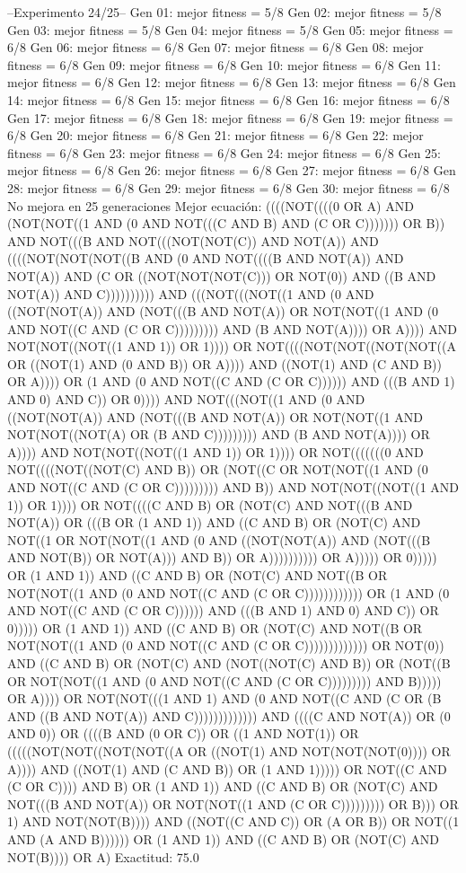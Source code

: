 --Experimento 
 24/25--
Gen 01: mejor fitness = 5/8
Gen 02: mejor fitness = 5/8
Gen 03: mejor fitness = 5/8
Gen 04: mejor fitness = 5/8
Gen 05: mejor fitness = 6/8
Gen 06: mejor fitness = 6/8
Gen 07: mejor fitness = 6/8
Gen 08: mejor fitness = 6/8
Gen 09: mejor fitness = 6/8
Gen 10: mejor fitness = 6/8
Gen 11: mejor fitness = 6/8
Gen 12: mejor fitness = 6/8
Gen 13: mejor fitness = 6/8
Gen 14: mejor fitness = 6/8
Gen 15: mejor fitness = 6/8
Gen 16: mejor fitness = 6/8
Gen 17: mejor fitness = 6/8
Gen 18: mejor fitness = 6/8
Gen 19: mejor fitness = 6/8
Gen 20: mejor fitness = 6/8
Gen 21: mejor fitness = 6/8
Gen 22: mejor fitness = 6/8
Gen 23: mejor fitness = 6/8
Gen 24: mejor fitness = 6/8
Gen 25: mejor fitness = 6/8
Gen 26: mejor fitness = 6/8
Gen 27: mejor fitness = 6/8
Gen 28: mejor fitness = 6/8
Gen 29: mejor fitness = 6/8
Gen 30: mejor fitness = 6/8
No mejora en 25 generaciones
Mejor ecuación: ((((NOT((((0 OR A) AND (NOT(NOT((1 AND (0 AND NOT(((C AND B) AND (C OR C))))))) OR B)) AND NOT(((B AND NOT(((NOT(NOT(C)) AND NOT(A)) AND ((((NOT(NOT(NOT((B AND (0 AND NOT((((B AND NOT(A)) AND NOT(A)) AND (C OR ((NOT(NOT(NOT(C))) OR NOT(0)) AND ((B AND NOT(A)) AND C)))))))))) AND (((NOT(((NOT((1 AND (0 AND ((NOT(NOT(A)) AND (NOT(((B AND NOT(A)) OR NOT(NOT((1 AND (0 AND NOT((C AND (C OR C))))))))) AND (B AND NOT(A)))) OR A)))) AND NOT(NOT((NOT((1 AND 1)) OR 1)))) OR NOT((((NOT(NOT((NOT(NOT((A OR ((NOT(1) AND (0 AND B)) OR A)))) AND ((NOT(1) AND (C AND B)) OR A)))) OR (1 AND (0 AND NOT((C AND (C OR C)))))) AND (((B AND 1) AND 0) AND C)) OR 0)))) AND NOT(((NOT((1 AND (0 AND ((NOT(NOT(A)) AND (NOT(((B AND NOT(A)) OR NOT(NOT((1 AND NOT(NOT((NOT(A) OR (B AND C))))))))) AND (B AND NOT(A)))) OR A)))) AND NOT(NOT((NOT((1 AND 1)) OR 1)))) OR NOT(((((((0 AND NOT((((NOT((NOT(C) AND B)) OR (NOT((C OR NOT(NOT((1 AND (0 AND NOT((C AND (C OR C))))))))) AND B)) AND NOT(NOT((NOT((1 AND 1)) OR 1)))) OR NOT((((C AND B) OR (NOT(C) AND NOT(((B AND NOT(A)) OR (((B OR (1 AND 1)) AND ((C AND B) OR (NOT(C) AND NOT((1 OR NOT(NOT((1 AND (0 AND ((NOT(NOT(A)) AND (NOT(((B AND NOT(B)) OR NOT(A))) AND B)) OR A)))))))))) OR A))))) OR 0))))) OR (1 AND 1)) AND ((C AND B) OR (NOT(C) AND NOT((B OR NOT(NOT((1 AND (0 AND NOT((C AND (C OR C)))))))))))) OR (1 AND (0 AND NOT((C AND (C OR C)))))) AND (((B AND 1) AND 0) AND C)) OR 0))))) OR (1 AND 1)) AND ((C AND B) OR (NOT(C) AND NOT((B OR NOT(NOT((1 AND (0 AND NOT((C AND (C OR C))))))))))))) OR NOT(0)) AND ((C AND B) OR (NOT(C) AND (NOT((NOT(C) AND B)) OR (NOT((B OR NOT(NOT((1 AND (0 AND NOT((C AND (C OR C))))))))) AND B))))) OR A)))) OR NOT(NOT(((1 AND 1) AND (0 AND NOT((C AND (C OR (B AND ((B AND NOT(A)) AND C))))))))))))) AND ((((C AND NOT(A)) OR (0 AND 0)) OR ((((B AND (0 OR C)) OR ((1 AND NOT(1)) OR (((((NOT(NOT((NOT(NOT((A OR ((NOT(1) AND NOT(NOT(NOT(0)))) OR A)))) AND ((NOT(1) AND (C AND B)) OR (1 AND 1))))) OR NOT((C AND (C OR C)))) AND B) OR (1 AND 1)) AND ((C AND B) OR (NOT(C) AND NOT(((B AND NOT(A)) OR NOT(NOT((1 AND (C OR C))))))))) OR B))) OR 1) AND NOT(NOT(B)))) AND ((NOT((C AND C)) OR (A OR B)) OR NOT((1 AND (A AND B)))))) OR (1 AND 1)) AND ((C AND B) OR (NOT(C) AND NOT(B)))) OR A)
 Exactitud: 75.0%

